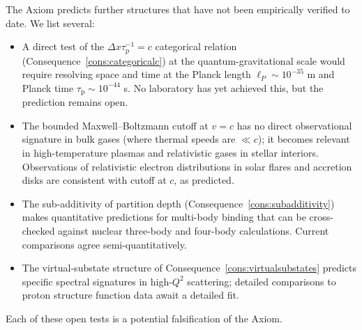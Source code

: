 \documentclass[11pt,twocolumn,a4paper]{article}
\theoremstyle{axiomstyle}
\theoremstyle{conseqstyle}
\theoremstyle{definition}
\theoremstyle{remark}
\newcommand{\taup}{\tau_{\mathrm{p}}}
\begin{document}
The Axiom predicts further structures that have not been empirically verified to date. We list several:
\begin{itemize}
\item A direct test of the $\Delta x\taup^{-1}=c$ categorical relation (Consequence~\ref{cons:categoricalc}) at the quantum-gravitational scale would require resolving space and time at the Planck length $\ell_{P}\sim 10^{-35}$ m and Planck time $\taup\sim 10^{-44}$ s. No laboratory has yet achieved this, but the prediction remains open.
\item The bounded Maxwell--Boltzmann cutoff at $v=c$ has no direct observational signature in bulk gases (where thermal speeds are $\ll c$); it becomes relevant in high-temperature plasmas and relativistic gases in stellar interiors. Observations of relativistic electron distributions in solar flares and accretion disks are consistent with cutoff at $c$, as predicted.
\item The sub-additivity of partition depth (Consequence~\ref{cons:subadditivity}) makes quantitative predictions for multi-body binding that can be cross-checked against nuclear three-body and four-body calculations. Current comparisons agree semi-quantitatively.
\item The virtual-substate structure of Consequence~\ref{cons:virtualsubstates} predicts specific spectral signatures in high-$Q^{2}$ scattering; detailed comparisons to proton structure function data await a detailed fit.
\end{itemize}
Each of these open tests is a potential falsification of the Axiom.
\end{document}
